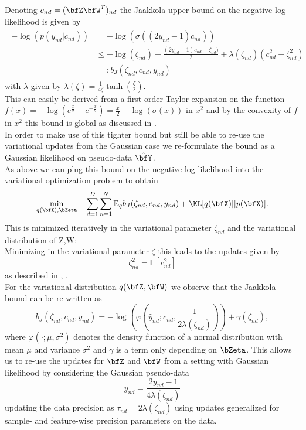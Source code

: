 Denoting $c_{nd}=(\bfZ\bfW^T)_{nd}$ the Jaakkola upper bound \cite{Jaakkola} on the negative log-likelihood is given by
\begin{align*}
\begin{split}
-\log\left(p(y_{nd}|c_{nd})\right) &= -\log\left(\sigma\left((2y_{nd}-1)  c_{nd}\right)\right)\\
& \leq -\log(\zeta_{nd})-\frac{(2y_{nd}-1)c_{nd}-\zeta_{nd})}{2} +\lambda(\zeta_{nd})\left(c_{nd}^2 -\zeta_{nd}^2 \right)\\
& =: b_J(\zeta_{nd}, c_{nd},y_{nd} )
\label{jaakkola}
\end{split}
\end{align*}
with $\lambda$ given by $\lambda(\zeta)=\frac{1}{4\zeta}\tanh\left(\frac{\zeta}{2}\right)$.\\
This can easily be derived from a first-order Taylor expansion on the function $f(x) = - \log(e^{\frac{x}{2}}+e^{-\frac{x}{2}}) = \frac{x}{2}-\log(\sigma(x))$ in $x^2$ and by the convexity of 
$f$ in $x^2$ this bound is global as discussed in \cite{Jaakkola}.\\
In order to make use of this tighter bound but still be able to re-use the variational updates from the Gaussian case we re-formulate the bound as a Gaussian likelihood on pseudo-data $\hat{\bfY}$.\\
As above we can plug this bound on the negative log-likelihood into the variational optimization problem to obtain  \begin{equation*}
\min_{q(\bfX),\bZeta} \quad \sum_{d=1}^{D}\sum_{n=1}^{N} \mathbb{E}_q b_J(\zeta_{nd}, c_{nd},y_{nd} ) + \KL[q(\bfX)||p(\bfX)].
\end{equation*}
This is minimized iteratively in the variational parameter $\zeta_{nd}$ and the variational distribution of Z,W:\\
Minimizing in the variational parameter $\zeta$ this leads to the updates given by
\begin{equation*}
\zeta_{nd}^2 = \mathbb{E}[c_{nd}^2]
\end{equation*}
as described in \cite{Jaakkola}, \cite{bishop2006pattern}.\\
For the variational distribution $q(\bfZ,\bfW)$ we observe that the Jaakkola bound can be re-written as 
\begin{equation*}
b_J(\zeta_{nd}, c_{nd},y_{nd} ) = -\log\left(\varphi\left(\hat{y}_{nd}; c_{nd}, \frac{1}{2\lambda(\zeta_{nd})}\right)\right) + \gamma(\zeta_{nd}),
\end{equation*}
where $\varphi(\cdot; \mu, \sigma^2)$ denotes the density function of a normal distribution with mean $\mu$ and variance $\sigma^2$ and $\gamma$ is a term only depending on $\bZeta$. This allows us to re-use the updates for $\bfZ$ and $\bfW$ from a setting with Gaussian likelihood by considering the Gaussian pseudo-data 
\begin{equation*}
\hat{y}_{nd}= \frac{2y_{nd}-1}{4 \lambda(\zeta_{nd})}
\end{equation*}
updating the data precision as $\tau_{nd} = 2\lambda(\zeta_{nd})$ using  updates generalized for sample- and feature-wise precision parameters on the data.


